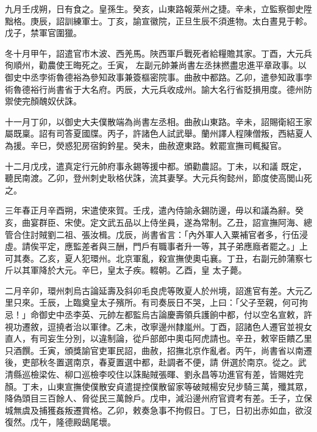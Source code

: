 \begin{pinyinscope}
 九月壬戌朔，日有食之。皇孫生。癸亥，山東路報萊州之捷。辛未，立監察御史陞黜格。庚辰，詔訓練軍士。丁亥，諭宣徽院，正旦生辰不須進物。太白晝見于軫。戊子，禁軍官圍獵。



 冬十月甲午，詔遣官市木波、西羌馬。陜西軍戶戰死者給糧贍其家。丁酉，大元兵徇順州，勸農使王晦死之。壬寅，
 左副元帥兼尚書左丞抹撚盡忠進平章政事。以御史中丞孛術魯德裕為參知政事兼簽樞密院事。曲赦中都路。乙卯，遣參知政事孛術魯德裕行尚書省于大名府。丙辰，大元兵收成州。諭大名行省貶損用度。德州防禦使完顏醜奴伏誅。



 十一月丁卯，以御史大夫僕散端為尚書左丞相。曲赦山東路。辛未，詔賜衛紹王家屬既稟。詔有司答夏國牒。丙子，許諸色人試武舉。蘭州譯人程陳僧叛，西結夏人為援。辛巳，熒惑犯房宿鉤鈐星。癸未，曲赦遼東路。敕罷宣撫司輒擬官。



 十二月戊戌，遣真定行元帥府事永錫等援中都。頒勸農詔。丁未，以和議
 既定，聽民南渡。乙卯，登州刺史耿格伏誅，流其妻孥。大元兵徇懿州，節度使高閭山死之。



 三年春正月辛酉朔，宋遣使來賀。壬戌，遣內侍諭永錫防邊，毋以和議為辭。癸亥，曲宴群臣、宋使。定文武五品以上侍坐員，遂為常制。乙丑，詔宣撫阿海、總管合住討賊劉二祖、張汝楫。戊辰，尚書省言：「內外軍人入粟補官者多，行伍浸虛。請俟平定，應監差者與三酬，門戶有職事者升一等，其子弟應廕者罷之。」上可其奏。乙亥，夏人犯環州。北京軍亂，殺宣撫使奧屯襄。丁丑，右副元帥蒲察七斤以其軍降於大元。辛巳，皇太子疾。輟朝。乙酉，皇
 太子薨。



 二月辛卯，環州刺烏古論延壽及斜卯毛良虎等敗夏人於州境，詔進官有差。大元乙里只來。壬辰，上臨奠皇太子殯所。有司奏辰日不哭，上曰：「父子至親，何可拘忌！」命御史中丞李英、元帥左都監烏古論慶壽領兵護餉中都，付以空名宣敕，許視功遷敘，逗撓者治以軍律。乙未，改寧邊州隸嵐州。丁酉，詔諸色人遷官並視女直人，有司妄生分別，以違制論，從戶部郎中奧屯阿虎請也。辛丑，敕宰臣饋乙里只酒饌。壬寅，頒獎諭官吏軍民詔，曲赦，招撫北京作亂者。丙午，尚書省以南遷後，吏部秋冬置選南京，春夏置選中都，赴調者不便，請
 併選於南京。從之。武清縣巡檢梁佐、柳口巡檢李咬住以誅颭賊張暉、劉永昌等功進官有差，皆賜姓完顏。丁未，山東宣撫使僕散安貞遣提控僕散留家等破賊楊安兒步騎三萬，殲其眾，降偽頭目三百餘人、脅從民三萬餘戶。戊申，減沿邊州府官資考有差。壬子，立保城無虞及捕獲姦叛遷賞格。乙卯，敕奏急事不拘假日。丁巳，日初出赤如血，欲沒復然。戊午，隆德殿鴟尾壞。




\end{pinyinscope}
